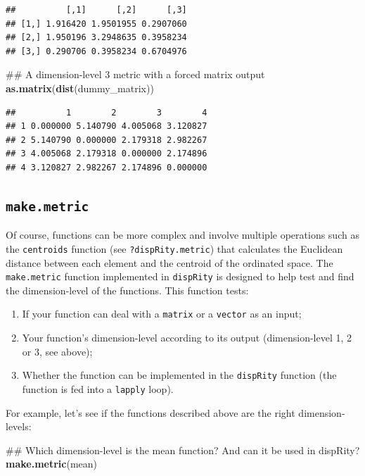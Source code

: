 \documentclass[]{book}
\newenvironment{Shaded}{\begin{snugshade}}{\end{snugshade}}
\newcommand{\KeywordTok}[1]{\textcolor[rgb]{0.13,0.29,0.53}{\textbf{#1}}}
\newcommand{\NormalTok}[1]{#1}
\providecommand{\tightlist}{%
  \setlength{\itemsep}{0pt}\setlength{\parskip}{0pt}}
\theoremstyle{definition}
\theoremstyle{definition}
\theoremstyle{remark}
\begin{document}
\begin{verbatim}
##          [,1]      [,2]      [,3]
## [1,] 1.916420 1.9501955 0.2907060
## [2,] 1.950196 3.2948635 0.3958234
## [3,] 0.290706 0.3958234 0.6704976
\end{verbatim}

\begin{Shaded}
\begin{Highlighting}[]
\NormalTok{## A dimension-level 3 metric with a forced matrix output}
\KeywordTok{as.matrix}\NormalTok{(}\KeywordTok{dist}\NormalTok{(dummy_matrix))}
\end{Highlighting}
\end{Shaded}

\begin{verbatim}
##          1        2        3        4
## 1 0.000000 5.140790 4.005068 3.120827
## 2 5.140790 0.000000 2.179318 2.982267
## 3 4.005068 2.179318 0.000000 2.174896
## 4 3.120827 2.982267 2.174896 0.000000
\end{verbatim}

\subsection{\texorpdfstring{\texttt{make.metric}}{make.metric}}\label{make.metric}

Of course, functions can be more complex and involve multiple operations
such as the \texttt{centroids} function (see \texttt{?dispRity.metric})
that calculates the Euclidean distance between each element and the
centroid of the ordinated space. The \texttt{make.metric} function
implemented in \texttt{dispRity} is designed to help test and find the
dimension-level of the functions. This function tests:

\begin{enumerate}
\def\labelenumi{\arabic{enumi}.}
\tightlist
\item
  If your function can deal with a \texttt{matrix} or a \texttt{vector}
  as an input;
\item
  Your function's dimension-level according to its output
  (dimension-level 1, 2 or 3, see above);
\item
  Whether the function can be implemented in the \texttt{dispRity}
  function (the function is fed into a \texttt{lapply} loop).
\end{enumerate}

For example, let's see if the functions described above are the right
dimension-levels:

\begin{Shaded}
\begin{Highlighting}[]
\NormalTok{## Which dimension-level is the mean function? And can it be used in dispRity?}
\KeywordTok{make.metric}\NormalTok{(mean)}
\end{Highlighting}
\end{Shaded}
\end{document}
